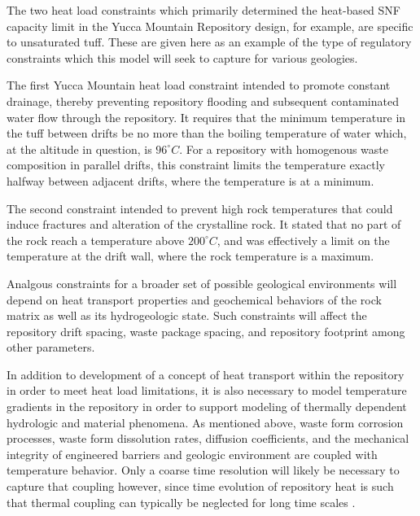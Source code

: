 The two heat load constraints which primarily determined the 
heat-based SNF capacity limit in the Yucca Mountain Repository design, 
for example, are specific to unsaturated tuff. These are given here as an 
example of the type of regulatory constraints which this model will seek to 
capture for various geologies. 

The first Yucca Mountain heat load constraint intended to promote constant 
drainage, thereby preventing repository flooding and subsequent 
contaminated water flow through the repository. It 
requires that the minimum temperature in the tuff between drifts be no  
more than the boiling temperature of water which, at the altitude in 
question, is $96^{\circ}C$. For a repository with homogenous waste composition 
in parallel drifts, this constraint limits the temperature exactly 
halfway between adjacent drifts, where the temperature is at a minimum.

The second constraint intended to prevent high rock temperatures that 
could induce fractures and alteration of the crystalline rock. It stated 
that no part of the rock reach a temperature above $200^{\circ}C$, and was 
effectively a limit on the temperature at the drift wall, where the 
rock temperature is a maximum.  

Analgous constraints for a broader set of possible geological 
environments will depend on heat transport properties and geochemical 
behaviors of the rock matrix as well as its hydrogeologic state.  
Such constraints will affect the  repository drift spacing, waste package 
spacing, and repository footprint among other parameters. 


In addition to development of a concept of heat transport within the 
repository in order to meet heat load limitations, it 
is also necessary to model temperature gradients in the repository in  
order to support modeling of thermally dependent hydrologic and material 
phenomena.  As mentioned above, waste form corrosion processes, waste form
dissolution rates, diffusion coefficients, and the mechanical 
integrity of engineered barriers and geologic environment are coupled with 
temperature behavior. Only a coarse time resolution will likely be necessary 
to capture that coupling however, since time evolution of repository heat is
such that thermal coupling can typically be neglected for long time scales
\cite{andra_argile:_2005}. %


